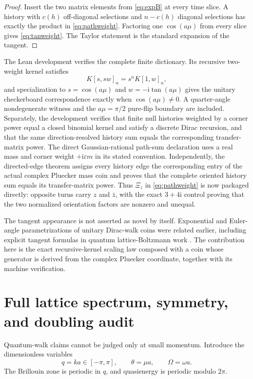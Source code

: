 \documentclass[11pt]{article}
\newcommand{\ii}{\mathrm{i}}
\begin{document}
\begin{proof}
Insert the two matrix elements from \eqref{eq:expB} at every time slice.  A
history with $c(h)$ off-diagonal selections and $n-c(h)$ diagonal selections
has exactly the product in \eqref{eq:pathweight}.  Factoring one
$\cos(a\mu)$ from every slice gives \eqref{eq:tanweight}.  The Taylor statement
is the standard expansion of the tangent.
\end{proof}

The Lean development verifies the complete finite dictionary.  Its recursive
two-weight kernel satisfies
\[
 K[s,sw]_n=s^nK[1,w]_n,
\]
and specialization to $s=\cos(a\mu)$ and
$w=-\ii\tan(a\mu)$ gives the unitary checkerboard correspondence exactly when
$\cos(a\mu)\neq0$.  A quarter-angle nondegenerate witness and the
$a\mu=\pi/2$ pure-flip boundary are included.  Separately, the development
verifies that finite null histories weighted by a corner power equal a closed
binomial kernel and satisfy a discrete Dirac recursion, and that the same
direction-resolved history sum equals the corresponding transfer-matrix power.
The direct Gaussian-rational path-sum declaration uses a real mass and corner
weight $+\ii\varepsilon m$ in its stated convention.  Independently, the
directed-edge theorem assigns every history edge the corresponding entry of
the actual complex Pluecker mass coin and proves that the complete oriented
history sum equals its transfer-matrix power.  Thus $\Xi_z$ in
\eqref{eq:pathweight} is now packaged directly: opposite turns carry $z$ and
$\bar z$, with the exact $3+4\ii$ control proving that the two normalized
orientation factors are nonzero and unequal.

The tangent appearance is not asserted as novel by itself.  Exponential and
Euler-angle parametrizations of unitary Dirac-walk coins were related earlier,
including explicit tangent formulas in quantum lattice-Boltzmann work
\cite{SucciQW}.  The contribution here is the exact recursive-kernel scaling
law composed with a coin whose generator is derived from the complex Pluecker
coordinate, together with its machine verification.

\section{Full lattice spectrum, symmetry, and doubling audit}
\label{sec:spectrum}

Quantum-walk claims cannot be judged only at small momentum.  Introduce the
dimensionless variables
\[
 q=ka\in[-\pi,\pi],
 \qquad
 \theta=\mu a,
 \qquad
 \Omega=\omega a.
\]
The Brillouin zone is periodic in $q$, and quasienergy is periodic modulo
$2\pi$.
\end{document}
